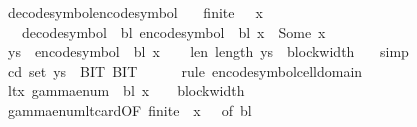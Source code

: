 \begin{isabellebody}
\isamarkupfalse%
\ decode{\isacharunderscore}{\kern0pt}symbol{\isacharunderscore}{\kern0pt}encode{\isacharunderscore}{\kern0pt}symbol{\isacharcolon}{\kern0pt}\isanewline
\ \ \ {\isachardoublequoteopen}finite\ {\isasymGamma}{\isachardoublequoteclose}\ \ {\isachardoublequoteopen}x\ {\isasymin}\ {\isasymGamma}{\isachardoublequoteclose}\isanewline
\ \ \ {\isachardoublequoteopen}decode{\isacharunderscore}{\kern0pt}symbol\ {\isasymGamma}\ bl\ {\isacharparenleft}{\kern0pt}encode{\isacharunderscore}{\kern0pt}symbol\ {\isasymGamma}\ bl\ x{\isacharparenright}{\kern0pt}\ {\isacharequal}{\kern0pt}\ Some\ x{\isachardoublequoteclose}\isanewline
%
\isadelimproof
%
\endisadelimproof
%
\isatagproof
{}\isamarkupfalse%
\ {\isacharminus}{\kern0pt}\isanewline
\ \ \isamarkupfalse%
\ {\isacharquery}{\kern0pt}ys\ {\isacharequal}{\kern0pt}\ {\isachardoublequoteopen}encode{\isacharunderscore}{\kern0pt}symbol\ {\isasymGamma}\ bl\ x{\isachardoublequoteclose}\isanewline
\ \ \isamarkupfalse%
\ len{\isacharcolon}{\kern0pt}\ {\isachardoublequoteopen}length\ {\isacharquery}{\kern0pt}ys\ {\isacharequal}{\kern0pt}\ block{\isacharunderscore}{\kern0pt}width\ {\isasymGamma}{\isachardoublequoteclose}\ \isamarkupfalse%
\ simp\isanewline
\ \ \isamarkupfalse%
\ cd{\isacharcolon}{\kern0pt}\ {\isachardoublequoteopen}set\ {\isacharquery}{\kern0pt}ys\ {\isasymsubseteq}\ {\isacharbraceleft}{\kern0pt}BIT{}{\isacharcomma}{\kern0pt}\ BIT{}{\isacharbraceright}{\kern0pt}{\isachardoublequoteclose}\isanewline
\ \ \ \ \isamarkupfalse%
\ {\isacharparenleft}{\kern0pt}rule\ encode{\isacharunderscore}{\kern0pt}symbol{\isacharunderscore}{\kern0pt}cell{\isacharunderscore}{\kern0pt}domain{\isacharparenright}{\kern0pt}\isanewline
\ \ \isamarkupfalse%
\ lt{\isacharunderscore}{\kern0pt}x{\isacharcolon}{\kern0pt}\ {\isachardoublequoteopen}gamma{\isacharunderscore}{\kern0pt}enum\ {\isasymGamma}\ bl\ x\ {\isacharless}{\kern0pt}\ {}\ {\isacharcircum}{\kern0pt}\ block{\isacharunderscore}{\kern0pt}width\ {\isasymGamma}{\isachardoublequoteclose}\isanewline
\ \ \ \ \isamarkupfalse%
\ gamma{\isacharunderscore}{\kern0pt}enum{\isacharunderscore}{\kern0pt}lt{\isacharunderscore}{\kern0pt}card{\isacharbrackleft}{\kern0pt}OF\ {\isacartoucheopen}finite\ {\isasymGamma}{\isacartoucheclose}\ {\isacartoucheopen}x\ {\isasymin}\ {\isasymGamma}{\isacartoucheclose}{\isacharcomma}{\kern0pt}\ of\ bl{\isacharbrackright}{\kern0pt}\isanewline

\end{isabellebody}
